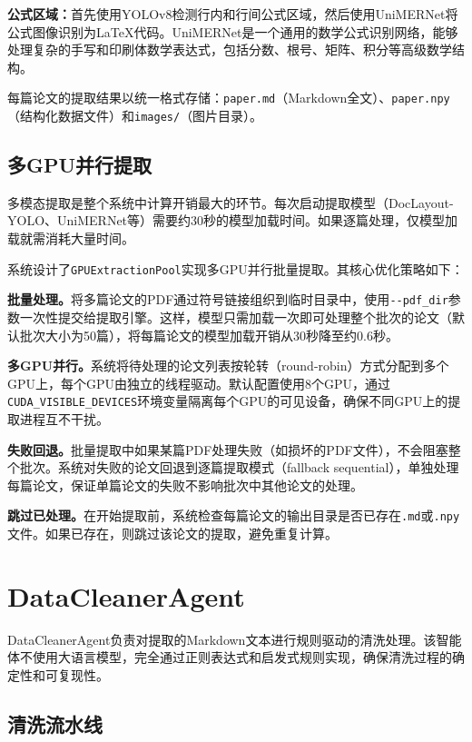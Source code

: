 \textbf{公式区域：}首先使用YOLOv8检测行内和行间公式区域，然后使用UniMERNet\cite{wang2024unimernet}将公式图像识别为LaTeX代码。UniMERNet是一个通用的数学公式识别网络，能够处理复杂的手写和印刷体数学表达式，包括分数、根号、矩阵、积分等高级数学结构。

每篇论文的提取结果以统一格式存储：\texttt{paper.md}（Markdown全文）、\texttt{paper.npy}（结构化数据文件）和\texttt{images/}（图片目录）。

\subsection{多GPU并行提取}

多模态提取是整个系统中计算开销最大的环节。每次启动提取模型（DocLayout-YOLO、UniMERNet等）需要约30秒的模型加载时间。如果逐篇处理，仅模型加载就需消耗大量时间。

系统设计了\texttt{GPUExtractionPool}实现多GPU并行批量提取。其核心优化策略如下：

\textbf{批量处理。}将多篇论文的PDF通过符号链接组织到临时目录中，使用\texttt{-{}-pdf\_dir}参数一次性提交给提取引擎。这样，模型只需加载一次即可处理整个批次的论文（默认批次大小为50篇），将每篇论文的模型加载开销从30秒降至约0.6秒。

\textbf{多GPU并行。}系统将待处理的论文列表按轮转（round-robin）方式分配到多个GPU上，每个GPU由独立的线程驱动。默认配置使用8个GPU，通过\texttt{CUDA\_VISIBLE\_DEVICES}环境变量隔离每个GPU的可见设备，确保不同GPU上的提取进程互不干扰。

\textbf{失败回退。}批量提取中如果某篇PDF处理失败（如损坏的PDF文件），不会阻塞整个批次。系统对失败的论文回退到逐篇提取模式（fallback sequential），单独处理每篇论文，保证单篇论文的失败不影响批次中其他论文的处理。

\textbf{跳过已处理。}在开始提取前，系统检查每篇论文的输出目录是否已存在\texttt{.md}或\texttt{.npy}文件。如果已存在，则跳过该论文的提取，避免重复计算。

\section{DataCleanerAgent}

DataCleanerAgent负责对提取的Markdown文本进行规则驱动的清洗处理。该智能体不使用大语言模型，完全通过正则表达式和启发式规则实现，确保清洗过程的确定性和可复现性。

\subsection{清洗流水线}

